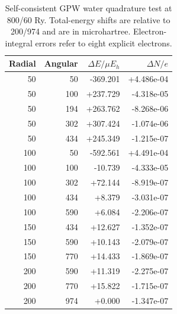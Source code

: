 \begin{table}[htbp]
\centering\small
\caption{Self-consistent GPW water quadrature test at 800/60 Ry. Total-energy shifts are relative to 200/974 and are in microhartree. Electron-integral errors refer to eight explicit electrons.}
\begin{tabular}{rrrr}
\toprule
Radial & Angular & $\Delta E/\mu E_h$ & $\Delta N/e$\\
\midrule
50 & 50 & -369.201 & +4.486e-04 \\
50 & 100 & +237.729 & -4.318e-05 \\
50 & 194 & +263.762 & -8.268e-06 \\
50 & 302 & +307.424 & -1.074e-06 \\
50 & 434 & +245.349 & -1.215e-07 \\
100 & 50 & -592.561 & +4.491e-04 \\
100 & 100 & -10.739 & -4.333e-05 \\
100 & 302 & +72.144 & -8.919e-07 \\
100 & 434 & +8.379 & -3.031e-07 \\
100 & 590 & +6.084 & -2.206e-07 \\
150 & 434 & +12.627 & -1.352e-07 \\
150 & 590 & +10.143 & -2.079e-07 \\
150 & 770 & +14.433 & -1.869e-07 \\
200 & 590 & +11.319 & -2.275e-07 \\
200 & 770 & +15.822 & -1.715e-07 \\
200 & 974 & +0.000 & -1.347e-07 \\
\bottomrule
\end{tabular}
\end{table}
